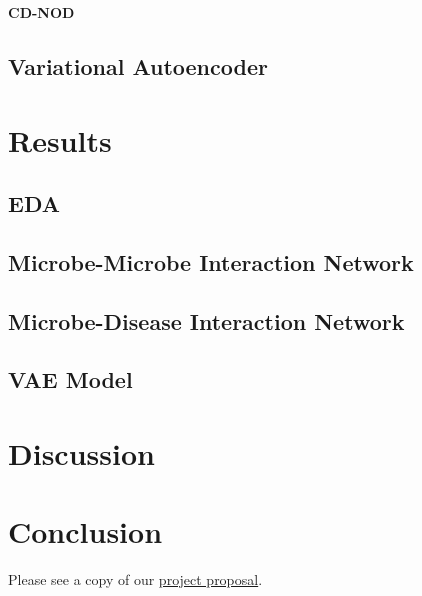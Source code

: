 \documentclass[12pt,letterpaper]{article}
\begin{document}
\textbf{CD-NOD}

\subsection{Variational Autoencoder}

\section{Results}

\subsection{EDA}

\subsection{Microbe-Microbe Interaction Network}

\subsection{Microbe-Disease Interaction Network}

\subsection{VAE Model}

\section{Discussion}

\section{Conclusion}


\clearpage
\makereference





\clearpage
\makeappendix

Please see a copy of our \href{https://drive.google.com/file/d/1fEGpmoSULPbpG6bcopPBKdlyF6gG_Gv_/view?usp=sharing}{project proposal}. 
\end{document}
